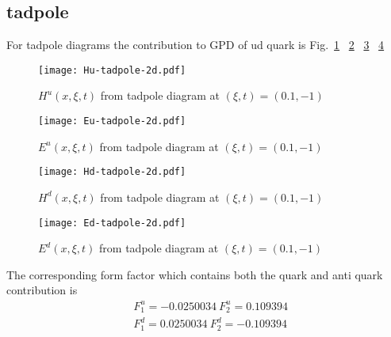 \documentclass[preprintnumbers,prd,superscriptaddress,preprint]{revtex4-1}
\begin{document}
	\subsection{tadpole}
	For tadpole diagrams the contribution to GPD of ud quark is Fig.~\ref{Hu-tad} ~\ref{Eu-tad}  ~\ref{Hd-tad} ~\ref{Ed-tad}  
	\begin{figure}[h]
		\begin{center}
			\texttt{[image: Hu-tadpole-2d.pdf]}
			\caption{$H^{u}(x,\xi,t)$ from tadpole diagram at $(\xi,t)=(0.1,-1)$} 
			\label{Hu-tad}
		\end{center}
	\end{figure}
	\begin{figure}[h]
		\begin{center}
			\texttt{[image: Eu-tadpole-2d.pdf]}
			\caption{$E^{u}(x,\xi,t)$ from tadpole diagram at $(\xi,t)=(0.1,-1)$} 
			\label{Eu-tad}
		\end{center}
	\end{figure}  
	\begin{figure}[h]
		\begin{center}
			\texttt{[image: Hd-tadpole-2d.pdf]}
			\caption{$H^{d}(x,\xi,t)$ from tadpole diagram at $(\xi,t)=(0.1,-1)$} 
			\label{Hd-tad}
		\end{center}
	\end{figure}
	\begin{figure}[h]
		\begin{center}
			\texttt{[image: Ed-tadpole-2d.pdf]}
			\caption{$E^{d}(x,\xi,t)$ from tadpole diagram at $(\xi,t)=(0.1,-1)$} 
			\label{Ed-tad}
		\end{center}
	\end{figure}  
	The corresponding form factor which contains both the quark and anti quark contribution is 
	\begin{align}
		& F^{u}_{1}=-0.0250034  \ F^{u}_{2}=0.109394 \\
		& F^{d}_{1}=0.0250034\ F^{d}_{2}=-0.109394
	\end{align}
\end{document}
